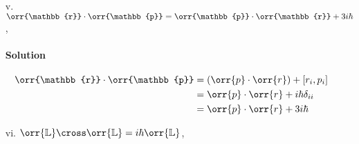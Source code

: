 \documentclass{article}
\begin{document}
{\begin{enumerate}
\begin{enumerate}
				\paragraph{Solution}  \unboldmath
				\begin{equation*}
					\begin{split}
						\mathbb{L}^2 &= \left( \orr{r} \cross \orr{p} \right) \cdot \left( \orr{r} \cross \orr{p} \right) = \left( \orr{r} \cross \orr{p} \right)_i \left( \orr{r} \cross \orr{p} \right)_i = \left( \epsilon_{ijk} r_j p_k \right) \left( \epsilon_{ilm} r_l p_m \right) \\
						&= \epsilon_{ijk} \epsilon_{ilm} r_j p_k r_l p_m = \left( \delta_{jl} \delta_{km} - \delta_{jm} \delta_{kl} \right) r_j p_k r_l p_m \\
						&= r_j p_k r_j p_k - r_j p_k r_k p_j = r_j p_k r_j p_k - r_j p_k r_k p_j \\
						&= r_j \left( -i\hbar \delta_{jk} + r_j p_k \right) p_k - r_j p_k \left( i\hbar \delta_{jk} + p_j r_k \right) \\
						&= -i\hbar r_j \delta_{jk} p_k + r_j r_j p_k p_k - i\hbar r_j \delta_{jk} p_k - r_j p_k p_j r_k \\
						&= -i\hbar r_j p_j + r^2 p^2 - i\hbar r_j p_j - r_j p_k p_j r_k \\
						&= -2i\hbar \orr{r} \cdot \orr{p} + r^2 p^2 - r_j p_j r_k p_k \\
						&= -2i\hbar \orr{r} \cdot \orr{p} + r^2 p^2 - \orr{r} \cdot \orr{p} \left( i\hbar \delta_{kk} + r_k p_k \right) \\
						&= -2i\hbar \orr{r} \cdot \orr{p} + r^2 p^2 - 3i\hbar \orr{r} \cdot \orr{p} - \orr{r} \cdot \orr{p} r_k p_k \\
						&= i\hbar \orr{r} \cdot \orr{p} + r^2 p^2 - \left( \orr{r} \cdot \orr{p} \right) \left( \orr{r} \cdot \orr{p} \right) \\
						&= i\hbar \orr{r} \cdot \orr{p} + r^2 p^2 - \left( \orr{r} \cdot \orr{p} \right)^2 \\
					\end{split}
				\end{equation*} \boldmath
				\item[v.] $ \orr{\mathbb{r}} \cdot \orr{\mathbb{p}} = \orr{\mathbb{p}} \cdot \orr{\mathbb{r}} + 3i\hbar $,
				\paragraph{Solution} \unboldmath
				\begin{equation*}
					\begin{split}
						\orr{\mathbb{r}} \cdot \orr{\mathbb{p}} &= \left( \orr{p} \cdot \orr{r} \right) + \left[ r_i , p_i \right] \\
						&= \orr{p} \cdot \orr{r} + i\hbar \delta_{ii} \\
						&= \orr{p} \cdot \orr{r} + 3i\hbar \\
					\end{split}
				\end{equation*} \boldmath
				\item[vi.] $ \orr{\mathbb{L}} \cross \orr{\mathbb{L}} = i\hbar \orr{\mathbb{L}} $,

\end{enumerate}
\end{enumerate}}
\end{document}

